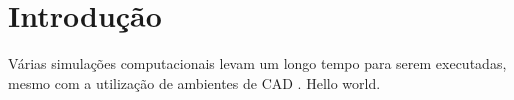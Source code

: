 
\chapter{Introdução}


Várias simulações computacionais levam um longo tempo para serem executadas, mesmo com a utilização de ambientes de  CAD \cite{silva2017raw}. Hello world.